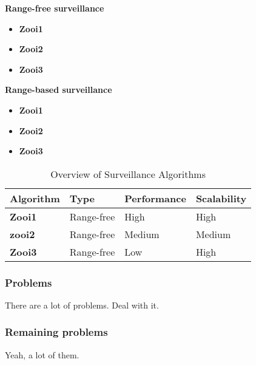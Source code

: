 \textbf{Range-free surveillance}
\begin{itemize}
\item \textbf{Zooi1}\\
\item \textbf{Zooi2}\\
\item \textbf{Zooi3}\\
\end{itemize}

\textbf{Range-based surveillance}
\begin{itemize}
\item \textbf{Zooi1}\\
\item \textbf{Zooi2}\\
\item \textbf{Zooi3}\\
\end{itemize}

  \begin{table}[!t]
  \renewcommand{\arraystretch}{1.3}
  \label{table_example}
  \centering
    \begin{tabular}{|l|p{2.2cm}|p{2.2cm}|p{2.2cm}|}
    \hline
    \bfseries Algorithm & \bfseries Type & \bfseries Performance & \bfseries Scalability\\
    \hline
    \bfseries Zooi1 & Range-free & High & High\\\hline
    \bfseries zooi2 & Range-free & Medium & Medium\\\hline
    \bfseries Zooi3 & Range-free & Low  & High\\\hline

    \end{tabular}
  \caption{Overview of Surveillance Algorithms}
  \end{table}


\subsubsection{Problems}
There are a lot of problems. Deal with it. 


\subsubsection{Remaining problems}
Yeah, a lot of them. 












